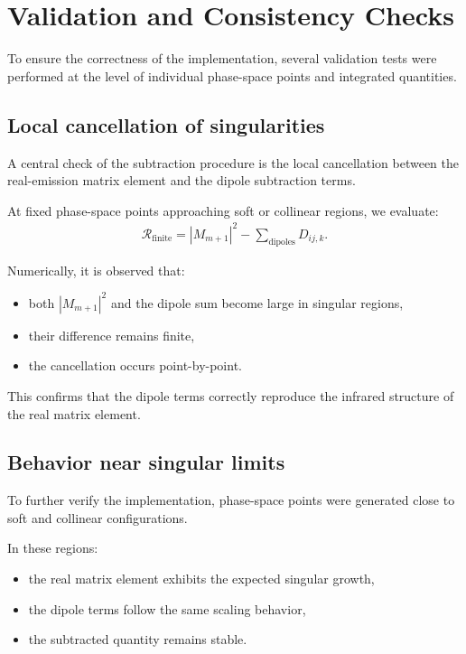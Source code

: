 \section{Validation and Consistency Checks}

To ensure the correctness of the implementation, several validation
tests were performed at the level of individual phase-space points
and integrated quantities.

\subsection{Local cancellation of singularities}

A central check of the subtraction procedure is the local cancellation
between the real-emission matrix element and the dipole subtraction terms.

At fixed phase-space points approaching soft or collinear regions,
we evaluate:
\begin{align}
\mathcal{R}_{\text{finite}} =
|M_{m+1}|^2 - \sum_{\text{dipoles}} D_{ij,k}.
\end{align}

Numerically, it is observed that:
\begin{itemize}
    \item both $|M_{m+1}|^2$ and the dipole sum become large in singular regions,
    \item their difference remains finite,
    \item the cancellation occurs point-by-point.
\end{itemize}

This confirms that the dipole terms correctly reproduce the infrared
structure of the real matrix element.

\subsection{Behavior near singular limits}

To further verify the implementation, phase-space points were generated
close to soft and collinear configurations.

In these regions:
\begin{itemize}
    \item the real matrix element exhibits the expected singular growth,
    \item the dipole terms follow the same scaling behavior,
    \item the subtracted quantity remains stable.
\end{itemize}


